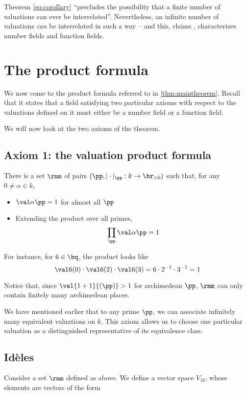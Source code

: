 Theorem \ref{eq:corollary} ``precludes the possibility that a finite number of
valuations can ever be interrelated''. Nevertheless, an infinite number of
valuations \textit{can} be interrelated in such a way -- and this, claims
\cite{artinwhaples}, characterizes number fields and function fields.

\section{The product formula}
\label{sec:productformula}

We now come to the product formula referred to in \ref{thm:maintheorem}. Recall
that it states that a field satisfying two particular axioms with respect to the
valuations defined on it must either be a number field or a function field.

We will now look at the two axioms of the theorem.

\subsection{Axiom 1: the valuation product formula}
\label{sub:axiom1}
\begin{axiom}
  \label{eq:axiom1}
  There is a set $\rmm$ of pairs $(\pp, |\cdot|_\pp: k\to\br_{>0})$ such that, for any $0\neq
  \alpha \in k$,
  \begin{itemize}
  \item $\val\alpha\pp = 1$ for almost all $\pp$
  \item Extending the product over all primes,
    \[ \prod_\pp \val\alpha\pp = 1 \]
  \end{itemize}
  For instance, for $6\in\bq$, the product looks like
  \[ \val6{(0)} \cdot\val6{(2)}\cdot\val6{(3)} = 6\cdot 2^{-1} \cdot 3^{-1} =
    1 \]
\end{axiom}
Notice that, since $\val{1+1}{(\pp)} > 1$ for archimedean $\pp$, $\rmm$ can only
contain finitely many archimedean places.

We have mentioned earlier that to any prime $\pp$, we can associate infinitely
many equivalent valuations on $k$. This axiom allows us to choose one particular
valuation as a distinguished representative of its equivalence class.

\subsection{Id\`eles}
\label{sec:orgheadline19}
Consider a set $\rmm$ defined as above. We define a vector space $V_M$, whose
elements are vectors of the form

